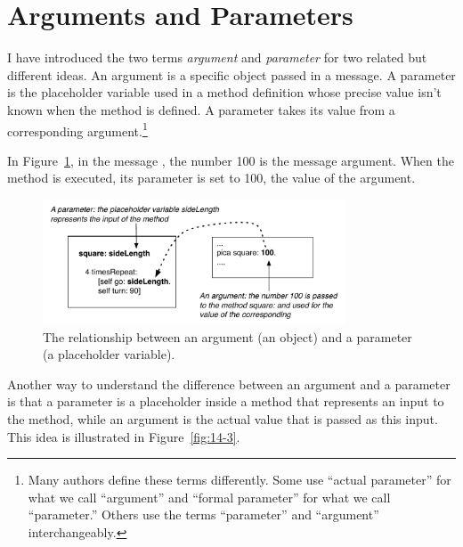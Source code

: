 \documentclass[a4paper,10pt,twoside]{book}
\begin{document}




\section{Arguments and Parameters}

I have introduced the two terms \emph{argument} and \emph{parameter} for two related but different ideas. 
An argument is a specific object passed in a message. A parameter is the placeholder variable 
used in a method definition whose precise value isn’t known when the method is defined. 
A parameter takes its value from a corresponding argument.\footnote{Many authors define these terms differently. Some use “actual parameter” for what we call “argument” and “formal parameter” for what we call “parameter.” Others use the terms “parameter” and “argument” interchangeably.}

In Figure~\ref{fig:14-2}, in the message , the number 100 is the message argument. 
When the method  is executed, its parameter  is set to 100, the value of the 
argument. 


\begin{figure}
	\begin{center}
\includegraphics[width=9cm]{argparam2}
\caption{The relationship between an argument (an object) and a parameter (a placeholder variable). \label{fig:14-2}}
\end{center}
\end{figure}


Another way to understand the difference between an argument and a parameter is that a 
parameter is a placeholder inside a method that represents an input to the method, while an 
argument is the actual value that is passed as this input. This idea is illustrated in Figure~\ref{fig:14-3}. 
\end{document}
